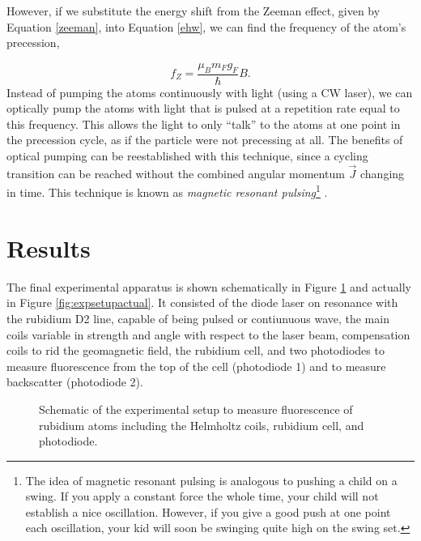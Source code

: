 \documentclass[]{revtex4}
\begin{document}

However, if we substitute the energy shift from the Zeeman effect, given by Equation \ref{zeeman}, into Equation \ref{ehw}, we can find the frequency of the atom's precession,

\begin{equation}
	f_Z = \frac{\mu_B m_F g_F}{\hbar} B.
  \label{zeemanf}
\end{equation}
%
Instead of pumping the atoms continuously with light (using a CW laser), we can optically pump the atoms with light that is pulsed at a repetition rate equal to this frequency. This allows the light to only ``talk'' to the atoms at one point in the precession cycle, as if the particle were not precessing at all. The benefits of optical pumping can be reestablished with this technique, since a cycling transition can be reached without the combined angular momentum $\vec J$ changing in time. This technique is known as \textit{magnetic resonant pulsing}\footnote{The idea of magnetic resonant pulsing is analogous to pushing a child on a swing. If you apply a constant force the whole time, your child will not establish a nice oscillation. However, if you give a good push at one point each oscillation, your kid will soon be swinging quite high on the swing set.} \cite{Kane2014}.

\section{Results}
The final experimental apparatus is shown schematically in Figure \ref{fig:expsetup} and actually in Figure \ref{fig:expsetupactual}. It consisted of the diode laser on resonance with the rubidium D2 line, capable of being pulsed or contiunuous wave, the main coils variable in strength and angle with respect to the laser beam, compensation coils to rid the geomagnetic field, the rubidium cell, and two photodiodes to measure fluorescence from the top of the cell (photodiode 1) and to measure backscatter (photodiode 2). 

\begin{figure}[ht]
	\centering
	
	\caption{Schematic of the experimental setup to measure fluorescence of rubidium atoms including the Helmholtz coils, rubidium cell, and photodiode.}
	\label{fig:expsetup}
\end{figure}
\end{document}
